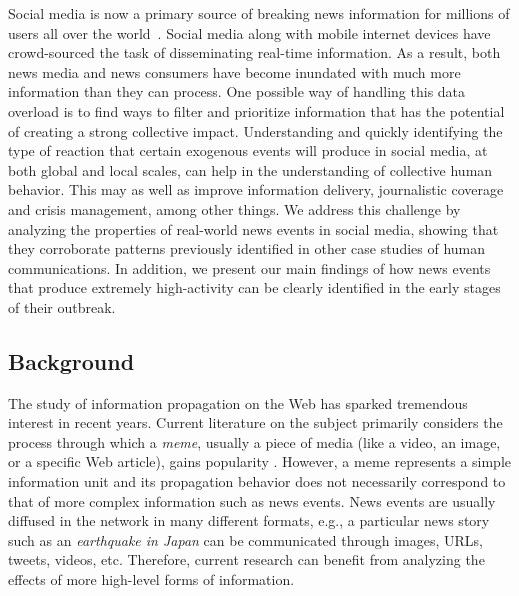 Social media is now a primary source of breaking news information for millions
of users all over the
world~\cite{Kwak:2010,petrovic2013can,broersma2013twitter,tandoc2016most,Rogers:2013:DTT:2464464.2464511}.
%
Social media along with mobile internet devices have crowd-sourced the
task of disseminating real-time information. 
%
As a result, both news media and news consumers have become inundated with much
more information than they can process. 
%
One possible way of handling this data overload is to find ways to filter and
prioritize information that has the potential of creating a strong collective
impact. 
%
Understanding and quickly identifying the type of reaction that certain
exogenous events will produce in social media, at both global and
local scales, can help in the understanding of collective human behavior.
%
This may as well as improve information delivery, journalistic coverage and
crisis management, among other things. 
%
We address this challenge by analyzing the properties of real-world news events
in social media, showing that they corroborate patterns previously identified in
other case studies of human communications. 
%
In addition, we present our main findings of how news events that produce
extremely high-activity can be clearly identified in the early stages of their
outbreak.

\subsection{Background}

The study of information propagation on the Web has sparked tremendous interest
in recent years. 
%
Current literature on the subject primarily considers the process through which
a {\em meme}, usually a piece of media (like a video, an image, or a specific
Web article), gains popularity
\cite{Castillo:2014,Szabo:2010,Lerman:2010,Tatar2014,Pinto:2013,Ahmed:2013,Li:2016:concept:drift,
Liu:2015:UN}. 
%
However, a meme represents a simple information unit and its propagation
behavior does not necessarily correspond to that of more complex information
such as news events. 
%
News events are usually diffused in the network in many different formats, e.g.,
a particular news story such as an {\em earthquake in Japan} can be communicated
through images, URLs, tweets, videos, etc. 
%
Therefore, current research can benefit from analyzing the effects of more
high-level forms of information. 

